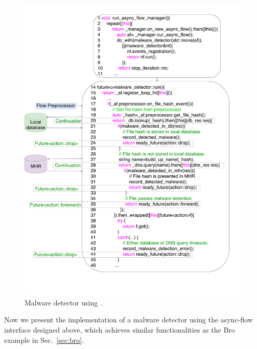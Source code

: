 \begin{figure}[!h]
\centering
\includegraphics[width=\columnwidth]{chap-netstar/figure/netstar_code_graph.pdf}
\caption{Malware detector using \netstar.}
\label{fig:netstar-code-sample}
\end{figure}


Now we present the implementation of a malware detector using the async-flow interface designed above, which achieves similar functionalities as the Bro example in Sec.~\ref{sec:bro}. %

